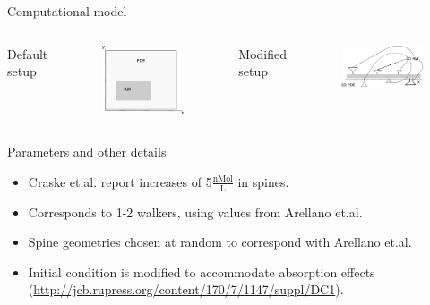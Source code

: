 \documentclass[12pt,a4paper, xcolor={usenames,dvipsnames,svgnames,table}]{beamer}
\begin{document}
\begin{frame}[shrink]{Computational model}

\begin{columns}
Default setup
\begin{figure}[H]
 \centering
 \includegraphics[width=\textwidth]{../Figures/hybrid_model_principle.eps}
\end{figure}
Modified setup
\begin{figure}[H]
 \centering
 \includegraphics[width=\textwidth]{../Figures/dendrite_spine_model.eps}
\end{figure}
\end{columns}
\end{frame}
\notetoself{}


\begin{frame}[shrink]{Parameters and other details}
\begin{itemize}
 \item <1-> Craske et.al. report increases of 5$\frac{\text{nMol}}{\text{L}}$ in spines.
 \item <2-> Corresponds to 1-2 walkers, using values from Arellano et.al.
 \item <3-> Spine geometries chosen at random to correspond with Arellano et.al.
 \item <4-> Initial condition is modified to accommodate absorption effects (\url{http://jcb.rupress.org/content/170/7/1147/suppl/DC1}).
\end{itemize}
\end{frame}
\notetoself{}
\end{document}
